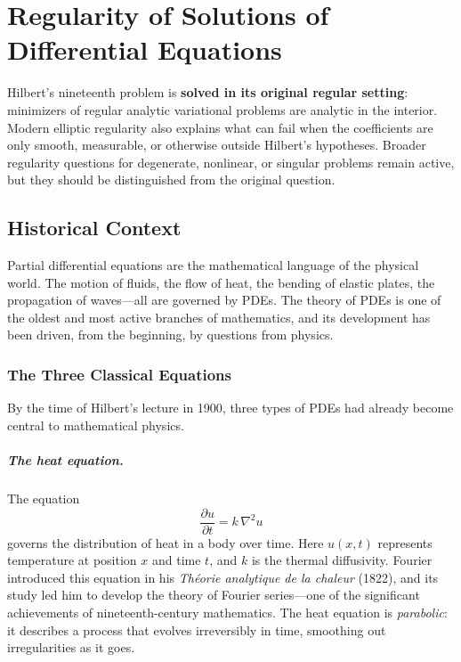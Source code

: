 
\chapter[PDE Regularity]{Regularity of Solutions of Differential Equations}
\label{ch:problem-19}

\begin{solvedbox}
Hilbert's nineteenth problem is \textbf{solved in its original regular setting}: minimizers of regular analytic variational problems are analytic in the interior. Modern elliptic regularity also explains what can fail when the coefficients are only smooth, measurable, or otherwise outside Hilbert's hypotheses. Broader regularity questions for degenerate, nonlinear, or singular problems remain active, but they should be distinguished from the original question.
\end{solvedbox}

\section{Historical Context}

Partial differential equations are the mathematical language of the physical world. The motion of fluids, the flow of heat, the bending of elastic plates, the propagation of waves---all are governed by PDEs. The theory of PDEs is one of the oldest and most active branches of mathematics, and its development has been driven, from the beginning, by questions from physics.

\subsection{The Three Classical Equations}

By the time of Hilbert's lecture in 1900, three types of PDEs had already become central to mathematical physics.

\paragraph{The heat equation.}
The equation
\[
    \frac{\partial u}{\partial t} = k \, \nabla^2 u
\]
governs the distribution of heat in a body over time. Here $u(x, t)$ represents temperature at position $x$ and time $t$, and $k$ is the thermal diffusivity. Fourier introduced this equation in his \emph{Th\'eorie analytique de la chaleur} (1822), and its study led him to develop the theory of Fourier series---one of the significant achievements of nineteenth-century mathematics. The heat equation is \emph{parabolic}: it describes a process that evolves irreversibly in time, smoothing out irregularities as it goes.

